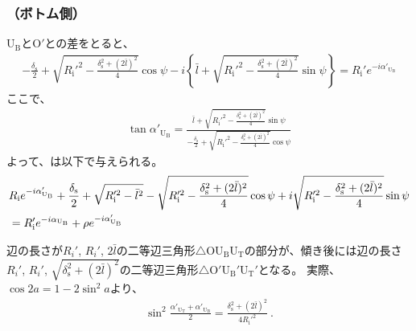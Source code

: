 \subsubsection{\AfterRotatePlateContactPoint（ボトム側）}
\AfterRotateBottomSideReceiverPlateCenter U$_\mathrm B$と\CurvatureCenter O$'$との差をとると、
\begin{align*}
  -\frac{\delta_\mathrm s}2+\sqrt{R_\mathrm i'^2-\frac{\delta_\mathrm s^2+(2\bar l)^2}4}\cos\psi
  -i\left\{\bar l+\sqrt{R_\mathrm i'^2-\frac{\delta_\mathrm s^2+(2\bar l)^2}4}\sin\psi\right\}
  = R_\mathrm i'e^{-i\alpha'_{\mathrm U_\mathrm B}}
\end{align*}
ここで、
\begin{align*}
  \tan\alpha'_{\mathrm U_\mathrm B}
  = \frac{\displaystyle\bar l+\sqrt{R_\mathrm i'^2-\frac{\delta_\mathrm s^2+(2\bar l)^2}4}\sin\psi}
         {\displaystyle-\frac{\delta_\mathrm s}2+\sqrt{R_\mathrm i'^2-\frac{\delta_\mathrm s^2+(2\bar l)^2}4}\cos\psi}
\end{align*}
よって、\AfterRotatePlateContactPoint は以下で与えられる。
\begin{align}
  \notag
  &  R_\mathrm ie^{-i\alpha'_{\mathrm U_\mathrm B}}
     +\frac{\delta_\mathrm s}2+\sqrt{R_\mathrm i'^2-\bar l^2}-\sqrt{R_\mathrm i'^2-\frac{\delta_\mathrm s^2+(2\bar l)^2}4}\cos\psi
     +i\sqrt{R_\mathrm i'^2-\frac{\delta_\mathrm s^2+(2\bar l)^2}4}\sin\psi\\
  &= R_\mathrm i'e^{-i\alpha_{\mathrm U_\mathrm B}}+\rho e^{-i\alpha'_{\mathrm U_\mathrm B}}
   \label{eq:afterUBcontact}
\end{align}
\begin{hosoku}
辺の長さが$R_i'$, $R_i'$, $2\bar l$の二等辺三角形$\triangle$OU$_\mathrm B$U$_\mathrm T$の部分が、傾き後には辺の長さ$R_i'$, $R_i'$, $\sqrt{\delta_\mathrm s^2+(2\bar l)^2}$の二等辺三角形$\triangle$O$'$U$_\mathrm B'$U$_\mathrm T'$となる。
実際、$\cos2a = 1-2\sin^2\!a$より、
\begin{align*}
  \sin^2\frac{\alpha'_{\mathrm U_\mathrm T}+\alpha'_{\mathrm U_\mathrm B}}2
  = \frac{\delta_\mathrm s^2+(2\bar l)^2}{4R_\mathrm i'^2}\ .
\end{align*}
\end{hosoku}


